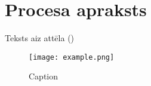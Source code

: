 \section{Procesa apraksts}

Teksts aiz attēla ()

\begin{figure}[H]
    \centering
    \texttt{[image: example.png]}
    \caption{Caption}
    \label{fig:imagename}
\end{figure}


\newpage